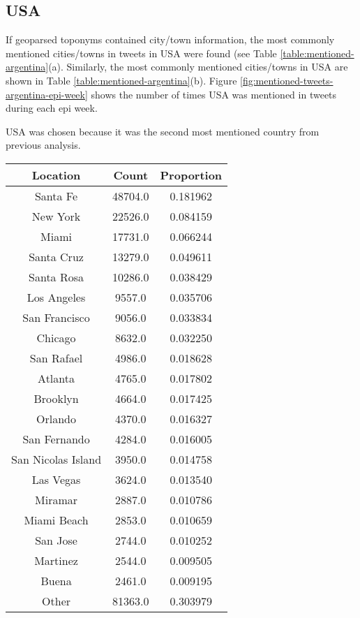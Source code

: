 \subsection{USA}

If geoparsed toponyms contained city/town information, the most commonly mentioned cities/towns in tweets in USA were found (see Table \ref{table:mentioned-argentina}(a).
Similarly, the most commonly mentioned cities/towns in USA are shown in Table \ref{table:mentioned-argentina}(b).
Figure \ref{fig:mentioned-tweets-argentina-epi-week} shows the number of times USA was mentioned in tweets during each epi week.

USA was chosen because it was the second most mentioned country from previous analysis.

\begin{table}
\centering
\begin{subtable}[c]{0.5\textwidth}
\centering
\begin{tabular}{|c|c|c|}
\hline
    \textbf{Location} & \textbf{Count} & \textbf{Proportion} \\
    \hline
    Santa Fe & 48704.0 & 0.181962 \\
    New York & 22526.0 & 0.084159 \\
    Miami & 17731.0 & 0.066244 \\
    Santa Cruz & 13279.0 & 0.049611 \\
    Santa Rosa & 10286.0 & 0.038429 \\
    Los Angeles & 9557.0 & 0.035706 \\
    San Francisco & 9056.0 & 0.033834 \\
    Chicago & 8632.0 & 0.032250 \\
    San Rafael & 4986.0 & 0.018628 \\
    Atlanta & 4765.0 & 0.017802 \\
    Brooklyn & 4664.0 & 0.017425 \\
    Orlando & 4370.0 & 0.016327 \\
    San Fernando & 4284.0 & 0.016005 \\
    San Nicolas Island & 3950.0 & 0.014758 \\
    Las Vegas & 3624.0 & 0.013540 \\
    Miramar & 2887.0 & 0.010786 \\
    Miami Beach & 2853.0 & 0.010659 \\
    San Jose & 2744.0 & 0.010252 \\
    Martinez & 2544.0 & 0.009505 \\
    Buena & 2461.0 & 0.009195 \\
    Other & 81363.0 & 0.303979 \\
    \hline
    \end{tabular}
\end{subtable}


\end{table}
